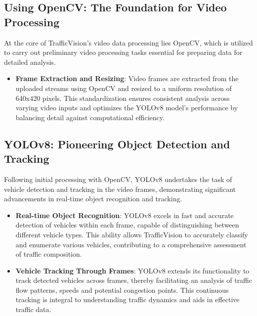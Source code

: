 \subsection{Using OpenCV: The Foundation for Video Processing}
At the core of TrafficVision's video data processing lies OpenCV, which is utilized to carry out preliminary video processing tasks essential for preparing data for detailed analysis.
\begin{itemize}
    \item \textbf{Frame Extraction and Resizing}: Video frames are extracted from the uploaded streams using OpenCV and resized to a uniform resolution of 640x420 pixels. This standardization ensures consistent analysis across varying video inputs and optimizes the YOLOv8 model's performance by balancing detail against computational efficiency.
\end{itemize}

\subsection{YOLOv8: Pioneering Object Detection and Tracking}
Following initial processing with OpenCV, YOLOv8 undertakes the task of vehicle detection and tracking in the video frames, demonstrating significant advancements in real-time object recognition and tracking.
\begin{itemize}
    \item \textbf{Real-time Object Recognition}: YOLOv8 excels in fast and accurate detection of vehicles within each frame, capable of distinguishing between different vehicle types. This ability allows TrafficVision to accurately classify and enumerate various vehicles, contributing to a comprehensive assessment of traffic composition.

    \item \textbf{Vehicle Tracking Through Frames}: YOLOv8 extends its functionality to track detected vehicles across frames, thereby facilitating an analysis of traffic flow patterns, speeds and potential congestion points. This continuous tracking is integral to understanding traffic dynamics and aids in effective traffic data.
\end{itemize}

